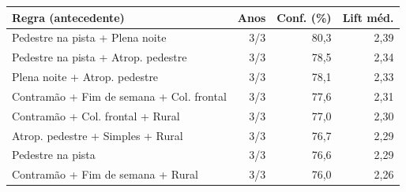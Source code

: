 \begin{tabular}{@{}>{\raggedright\arraybackslash}p{6.5cm}rrr@{}}
\toprule
\textbf{Regra (antecedente)} & \textbf{Anos} & \textbf{Conf. (\%)} & \textbf{Lift m\'ed.} \\
\midrule
Pedestre na pista + Plena noite & 3/3 & 80,3 & 2,39 \\
Pedestre na pista + Atrop. pedestre & 3/3 & 78,5 & 2,34 \\
Plena noite + Atrop. pedestre & 3/3 & 78,1 & 2,33 \\
Contramão + Fim de semana + Col. frontal & 3/3 & 77,6 & 2,31 \\
Contramão + Col. frontal + Rural & 3/3 & 77,0 & 2,30 \\
Atrop. pedestre + Simples + Rural & 3/3 & 76,7 & 2,29 \\
Pedestre na pista & 3/3 & 76,6 & 2,29 \\
Contramão + Fim de semana + Rural & 3/3 & 76,0 & 2,26 \\
\bottomrule
\end{tabular}